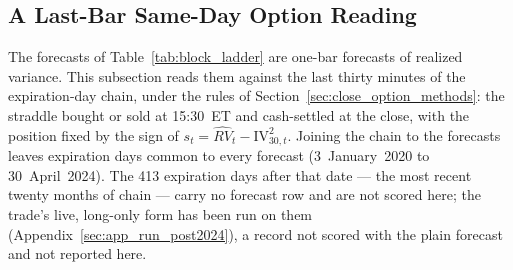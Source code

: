\subsection{A Last-Bar Same-Day Option Reading}
\label{sec:close_option_results}

\ifdefined\cmNdays\else\fi
\ifdefined\fqsPairs\else\fi
\ifdefined\bkNSeries\else\fi %
The forecasts of Table~\ref{tab:block_ladder} are one-bar forecasts of
realized variance. This subsection reads them against the last thirty
minutes of the expiration-day chain, under the rules of
Section~\ref{sec:close_option_methods}: the straddle bought or sold at
15:30~ET and cash-settled at the close, with the position fixed by the sign of
$s_t = \widehat{RV}_t - \mathrm{IV}_{30,t}^{2}$. Joining the chain to the
forecasts leaves \cmNdays{} expiration days common to every forecast %
(3~January~2020 to 30~April~2024). The 413 expiration days after that date
--- the most recent twenty months of chain --- carry no forecast row and are
not scored here; the trade's live, long-only form has been run on them
(Appendix~\ref{sec:app_run_post2024}), a record not scored with the plain forecast and
not reported here.

